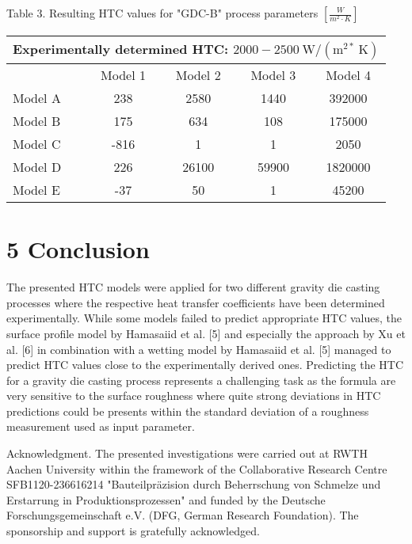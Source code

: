 \documentclass[10pt]{article}
\begin{document}
Table 3. Resulting HTC values for "GDC-B" process parameters $\left[\frac{W}{m^{2} \cdot K}\right]$

\begin{center}
\begin{tabular}{l|cccc}
\multicolumn{5}{c}{Experimentally determined HTC: $2000-2500 \mathrm{~W} /\left(\mathrm{m}^{2 *} \mathrm{~K}\right)$} \\
\hline
 & Model 1 & Model 2 & Model 3 & Model 4 \\
\cline { 2 - 5 }
Model A & 238 & 2580 & 1440 & 392000 \\
Model B & 175 & 634 & 108 & 175000 \\
Model C & -816 & 1 & 1 & 2050 \\
Model D & 226 & 26100 & 59900 & 1820000 \\
Model E & -37 & 50 & 1 & 45200 \\
\hline
\end{tabular}
\end{center}

\section*{5 Conclusion}
The presented HTC models were applied for two different gravity die casting processes where the respective heat transfer coefficients have been determined experimentally. While some models failed to predict appropriate HTC values, the surface profile model by Hamasaiid et al. [5] and especially the approach by $\mathrm{Xu}$ et al. [6] in combination with a wetting model by Hamasaiid et al. [5] managed to predict HTC values close to the experimentally derived ones. Predicting the HTC for a gravity die casting process represents a challenging task as the formula are very sensitive to the surface roughness where quite strong deviations in HTC predictions could be presents within the standard deviation of a roughness measurement used as input parameter.

Acknowledgment. The presented investigations were carried out at RWTH Aachen University within the framework of the Collaborative Research Centre SFB1120-236616214 "Bauteilpräzision durch Beherrschung von Schmelze und Erstarrung in Produktionsprozessen" and funded by the Deutsche Forschungsgemeinschaft e.V. (DFG, German Research Foundation). The sponsorship and support is gratefully acknowledged.
\end{document}
